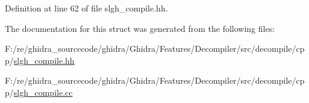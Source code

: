 Definition at line 62 of file slgh\+\_\+compile.\+hh.



The documentation for this struct was generated from the following files\+:\begin{DoxyCompactItemize}
\item 
F\+:/re/ghidra\+\_\+sourcecode/ghidra/\+Ghidra/\+Features/\+Decompiler/src/decompile/cpp/\mbox{\hyperlink{slgh__compile_8hh}{slgh\+\_\+compile.\+hh}}\item 
F\+:/re/ghidra\+\_\+sourcecode/ghidra/\+Ghidra/\+Features/\+Decompiler/src/decompile/cpp/\mbox{\hyperlink{slgh__compile_8cc}{slgh\+\_\+compile.\+cc}}\end{DoxyCompactItemize}
